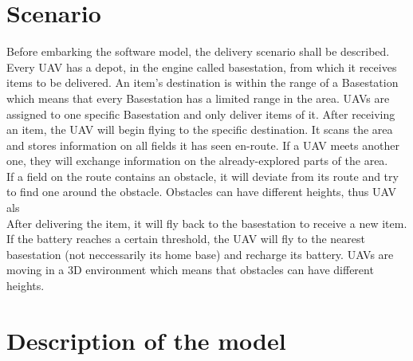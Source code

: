 \section{Scenario}
Before embarking the software model, the delivery scenario shall be described.  Every UAV has a depot, in the engine called basestation, from which it receives items to be delivered. An item's destination is within the range of a Basestation which means that every Basestation has a limited range in the area. UAVs are assigned to one specific Basestation and only deliver items of it. After receiving an item, the UAV will begin flying to the specific destination. It scans the area and stores information on all fields it has seen en-route. If a UAV meets another one, they will exchange information on the already-explored parts of the area.\\
If a field on the route contains an obstacle, it will deviate from its route and try to find one around the obstacle. Obstacles can have different heights, thus UAV als\\
After delivering the item, it will fly back to the basestation to receive a new item. If the battery reaches a certain threshold, the UAV will fly to the nearest basestation (not neccessarily its home base) and recharge its battery. 
 UAVs are moving in a 3D environment which means that obstacles can have different heights.

\section{Description of the model}

